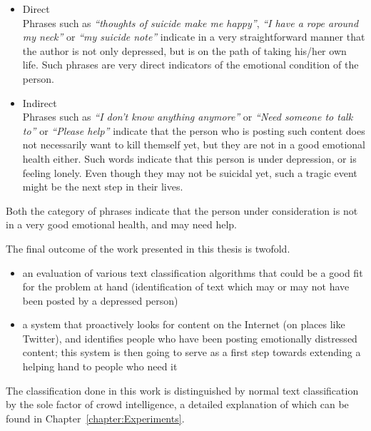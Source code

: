 \begin{itemize}
    \item{
    Direct\\
    Phrases such as \emph{``thoughts of suicide make me happy''}, \emph{``I have a rope around my neck''} or \emph{``my suicide note''} indicate in a very straightforward manner that the author is not only depressed, but is on the path of taking his/her own life. Such phrases are very direct indicators of the emotional condition of the person.
    }
    \item{
    Indirect\\
    Phrases such as \emph{``I don't know anything anymore''} or \emph{``Need someone to talk to''} or \emph{``Please help''} indicate that the person who is posting such content does not necessarily want to kill themself yet, but they are not in a good emotional health either. Such words indicate that this person is under depression, or is feeling lonely. Even though they may not be suicidal yet, such a tragic event might be the next step in their lives. 
    }
\end{itemize}

Both the category of phrases indicate that the person under consideration is not in a very good emotional health, and may need help.

The final outcome of the work presented in this thesis is twofold.

\begin{itemize}
    \item{an evaluation of various text classification algorithms that could be a good fit for the problem at hand (identification of text which may or may not have been posted by a depressed person)}
    \item{a system that proactively looks for content on the Internet (on places like Twitter), and identifies people who have been posting emotionally distressed content; this system is then going to serve as a first step towards extending a helping hand to people who need it}
\end{itemize}

The classification done in this work is distinguished by normal text classification by the sole factor of crowd intelligence, a detailed explanation of which can be found in Chapter~\ref{chapter:Experiments}.
